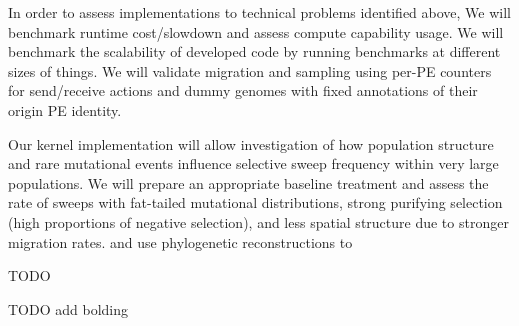 In order to assess implementations to technical problems identified above,
We will benchmark runtime cost/slowdown and assess compute capability usage.
We will benchmark the scalability of developed code by running benchmarks at different sizes of things.
We will validate migration and sampling using per-PE counters for send/receive actions and dummy genomes with fixed annotations of their origin PE identity.

Our kernel implementation will allow investigation of how population structure and rare mutational events influence selective sweep frequency within very large populations.
We will prepare an appropriate baseline treatment and assess the rate of sweeps with fat-tailed mutational distributions, strong purifying selection (high proportions of negative selection), and less spatial structure due to stronger migration rates.
and use phylogenetic reconstructions to

TODO





TODO add bolding

